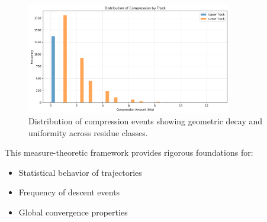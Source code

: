 \begin{figure}[h]
\centering
\includegraphics[width=0.8\textwidth]{entropy/compression_distribution.png}
\caption{Distribution of compression events showing geometric decay and uniformity across residue classes.}
\label{fig:compression_dist}
\end{figure}

This measure-theoretic framework provides rigorous foundations for:
\begin{itemize}
\item Statistical behavior of trajectories
\item Frequency of descent events
\item Global convergence properties
\end{itemize} 